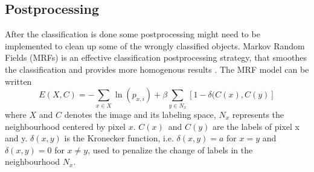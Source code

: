 \documentclass{article}
\begin{document}
\subsection{Postprocessing}

After the classification is done some postprocessing might need to be implemented to clean up some of the wrongly classified objects. Markov Random Fields (MRFs) is an effective classification postprocessing strategy, that smoothes the classification and provides more homogenous results \citep{mrf}. The MRF model can be written 
\begin{equation*}
E(X,C) = -\sum_{x\in X}\ln(p_{x,i}) + \beta\sum_{y\in N_{x}}[1 - \delta(C(x), C(y)]
\end{equation*}
where $X$ and $C$ denotes the image and its labeling space, $N_{x}$ represents the neighbourhood centered by pixel $x$. $C(x)$ and $C(y)$ are the labels of pixel x and y. $\delta(x,y)$ is the Kronecker function, i.e. $\delta(x,y) = a$ for $x = y$ and $\delta(x,y) = 0$ for $x \neq y$, used to penalize the change of labels in the neighbourhood $N_{x}$.
\end{document}
